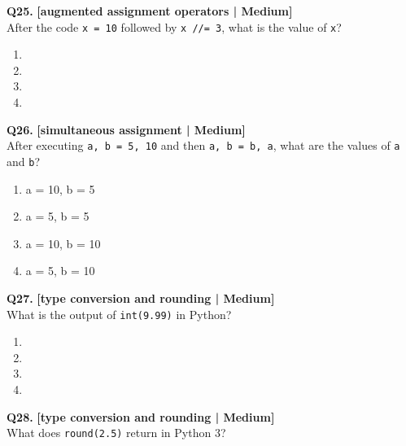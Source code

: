 \noindent\textbf{Q25.} \hfill {\small\color{LPUOrange}\textbf{[augmented assignment operators | Medium]}}\\[2pt]
After the code \texttt{x = 10} followed by \texttt{x //= 3}, what is the value of \texttt{x}?

\begin{enumerate}[label=(\alph*),topsep=2pt,itemsep=1pt,partopsep=0pt,parsep=0pt]
    \item {}
    \item {}
    \item {}
    \item {}
\end{enumerate}
\vspace{2mm}

\noindent\textbf{Q26.} \hfill {\small\color{LPUOrange}\textbf{[simultaneous assignment | Medium]}}\\[2pt]
After executing \texttt{a, b = 5, 10} and then \texttt{a, b = b, a}, what are the values of \texttt{a} and \texttt{b}?

\begin{enumerate}[label=(\alph*),topsep=2pt,itemsep=1pt,partopsep=0pt,parsep=0pt]
    \item \relax a = 10, b = 5
    \item \relax a = 5, b = 5
    \item \relax a = 10, b = 10
    \item \relax a = 5, b = 10
\end{enumerate}
\vspace{2mm}

\noindent\textbf{Q27.} \hfill {\small\color{LPUOrange}\textbf{[type conversion and rounding | Medium]}}\\[2pt]
What is the output of \texttt{int(9.99)} in Python?

\begin{enumerate}[label=(\alph*),topsep=2pt,itemsep=1pt,partopsep=0pt,parsep=0pt]
    \item {}
    \item {}
    \item {}
    \item {}
\end{enumerate}
\vspace{2mm}

\noindent\textbf{Q28.} \hfill {\small\color{LPUOrange}\textbf{[type conversion and rounding | Medium]}}\\[2pt]
What does \texttt{round(2.5)} return in Python 3?

